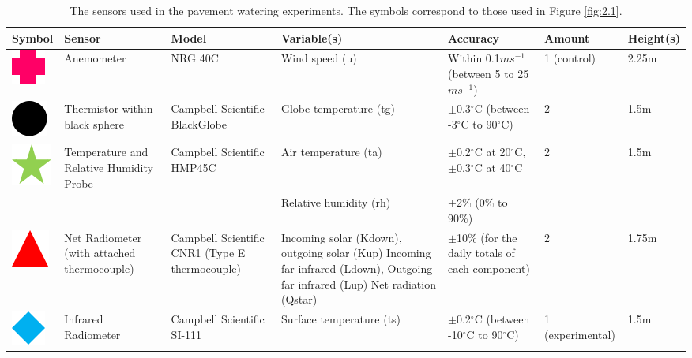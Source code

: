 \documentclass[final,3p,times,authoryear]{elsarticle}
\begin{document}
\begin{table}[!ht]\caption{The sensors used in the pavement watering experiments. The symbols correspond to those used in Figure \ref{fig:2.1}.}
    \centering
   \footnotesize 
    \begin{tabular}{|p{0.90cm}|p{2.0cm}|p{2.0cm}|p{3.5cm}|p{2.5cm}|p{1.0cm}|p{1.0cm}|}
    \hline
        Symbol & Sensor & Model & Variable(s) & Accuracy & Amount & Height(s) \\ \hline
        \includegraphics[trim={0 0 0 0},clip,scale=0.5]{Picture1.png}& Anemometer & NRG 40C & Wind speed (\gls{u}) & Within 0.1$ms^{-1}$ (between 5 to 25$ms^{-1}$) & 1 (control) & 2.25m  \\ \hline
        \includegraphics[trim={0 0 0 0},clip,scale=0.5]{Picture2.png}& Thermistor within black sphere & Campbell Scientific BlackGlobe & Globe temperature (\gls{tg}) & $\pm$0.3$^{\circ}$C (between -3$^{\circ}$C to 90$^{\circ}$C) & 2 & 1.5m  \\ \hline               
\includegraphics[trim={0 0 0 0},clip,scale=0.5]{Picture3.png} &Temperature and Relative Humidity Probe &Campbell Scientific HMP45C&Air temperature (\gls{ta})&$\pm$0.2$^{\circ}$C at 20$^{\circ}$C, $\pm$0.3$^{\circ}$C at 40$^{\circ}$C &2&1.5m \\ 
  &&&Relative humidity (\gls{rh})&$\pm$2\% (0\% to 90\%)&& \\ \hline
\includegraphics[trim={0 0 0 0},clip,scale=0.5]{Picture4.png}&Net Radiometer (with attached thermocouple) &Campbell Scientific CNR1 (Type E thermocouple)&Incoming solar (\gls{Kdown}), outgoing solar (\gls{Kup})
Incoming far infrared (\gls{Ldown}),
Outgoing far infrared (\gls{Lup})
Net radiation (\gls{Qstar})&$\pm$10\% (for the daily totals of each component)&2&1.75m \\ \hline 
\includegraphics[trim={0 0 0 0},clip,scale=0.5]{Picture5.png}&Infrared Radiometer&Campbell Scientific SI-111&Surface temperature (\gls{ts})&$\pm$0.2$^{\circ}$C (between -10$^{\circ}$C to 90$^{\circ}$C)&1 (experimental)&1.5m \\ \hline   

\end{tabular}
\end{table}
\end{document}
